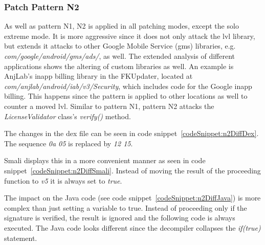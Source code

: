 \subsubsection{Patch Pattern N2}
As well as pattern N1, N2 is applied in all patching modes, except the solo extreme mode.
It is more aggressive since it does not only attack the \gls{lvl} library, but extends it attacks to other Google Mobile Service (gms) libraries, e.g.  \textit{com/google/android/gms/ads/}, as well.
The extended analysis of different applications shows the altering of custom libraries as well.
An example is AnjLab's inapp billing library \cite{inappBilling} in the FKUpdater, located at \textit{com/anjlab/android/iab/v3/Security}, which includes code for the Google inapp billing.
This happens since the pattern is applied to other locations as well to counter a moved \gls{lvl}.
Similar to pattern N1, pattern N2 attacks the \textit{LicenseValidator} class's \textit{verify()} method.
\newline

The changes in the \gls{dex} file can be seen in code snippet~\ref{codeSnippet:n2DiffDex}.
The sequence \textit{0a 05} is replaced by \textit{12 15}.
\newline

Smali displays this in a more convenient manner as seen in code snippet~\ref{codeSnippet:n2DiffSmali}.
Instead of moving the result of the proceeding function to \textit{v5} it is always set to \textit{true}.
\newline


The impact on the Java code (see code snippet~\ref{codeSnippet:n2DiffJava}) is more complex than just setting a variable to true.
Instead of proceeding only if the signature is verified, the result is ignored and the following code is always executed.
The Java code looks different since the decompiler collapses the \textit{if(true)} statement.
\newline


